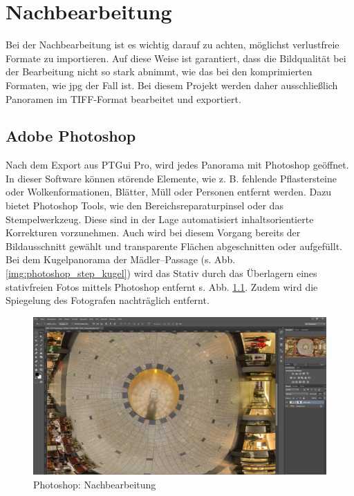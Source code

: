 \documentclass[liststotoc,bibtotoc,fontsize=14pt,]{scrreprt}
\begin{document}
	\chapter{Nachbearbeitung}
	\label{ch:nach}
	Bei der Nachbearbeitung ist es wichtig darauf zu achten, möglichst verlustfreie Formate zu importieren. Auf diese Weise ist garantiert, dass die Bildqualität bei der Bearbeitung nicht so stark abnimmt, wie das bei den komprimierten Formaten, wie jpg der Fall ist. Bei diesem Projekt werden daher ausschließlich Panoramen im TIFF-Format bearbeitet und exportiert.
	
	\section{Adobe Photoshop}
	\label{sec:photo}
	Nach dem Export aus PTGui Pro, wird jedes Panorama mit Photoshop geöffnet. In dieser Software können störende Elemente, wie z. B. fehlende Pflastersteine oder Wolkenformationen, Blätter, Müll oder Personen entfernt werden. Dazu bietet Photoshop Tools, wie den Bereichsreparaturpinsel oder das Stempelwerkzeug. Diese sind in der Lage automatisiert inhaltsorientierte Korrekturen vorzunehmen. Auch wird bei diesem Vorgang bereits der Bildausschnitt gewählt und transparente Flächen abgeschnitten oder aufgefüllt.
	\bigskip
	Bei dem Kugelpanorama der Mädler--Passage (s. Abb. \ref{img:photoshop_step_kugel}) wird das Stativ durch das Überlagern eines stativfreien Fotos mittels Photoshop entfernt s. Abb. \ref{img:photoshop_bearbeitung}. Zudem wird die Spiegelung des Fotografen nachträglich entfernt.  
	
	\begin{figure}[H]
		\includegraphics[width=\linewidth]{img/steps/PS_Kugel_Edit.PNG}
		\caption{Photoshop: Nachbearbeitung}
		\label{img:photoshop_bearbeitung}
	\end{figure}
	
\end{document}
